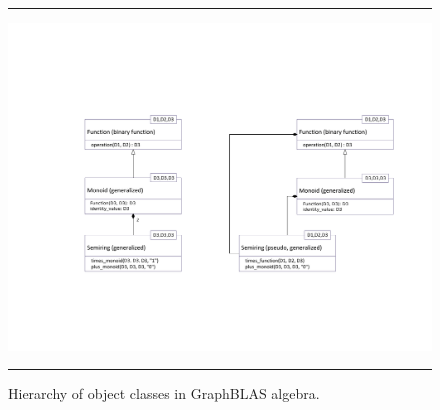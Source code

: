 \documentclass[11pt]{extarticle}
\begin{document}
\begin{figure}[htb]
\hrule
\begin{center}
\includegraphics[width=1.0\linewidth,trim=0in 2in 0in 2in]{Algebra_Hierarchy_proposed.pdf}
\end{center}
\caption{Hierarchy of object classes in GraphBLAS algebra.}
\label{Fig:AlgebraHierarchyProposed}
\hrule
\end{figure}
\end{document}
